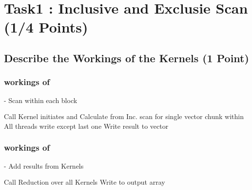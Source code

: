 \section{Task1 : Inclusive and Exclusie Scan (1/4 Points)}
\subsection{Describe the Workings of the Kernels (1 Point)}
 
\subsubsection*{ workings of }
\begin{algorithm}
	\renewcommand{\thealgorithm}{}
	\caption{ - Scan within each block} 
	\begin{algorithmic}[1]
	\State Call  
	\State Kernel initiates  and 
    \State Calculate  from  
    \State Inc. scan for single vector chunk within  
    \State All threads write  except last one 
    \State Write result to vector 
	\end{algorithmic}
\end{algorithm}

\subsubsection*{ workings of }

\begin{algorithm}
	\renewcommand{\thealgorithm}{}
	\caption{ - Add results from Kernels} 
	\begin{algorithmic}[1]
	\State Call  
	\State Reduction over all Kernels
	\State Write to output array 
	\State {}
	\end{algorithmic}
\end{algorithm}



